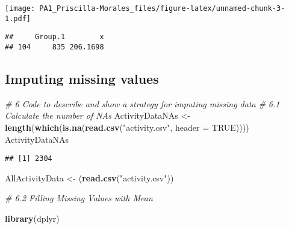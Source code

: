 \documentclass[
]{article}
\newenvironment{Shaded}{\begin{snugshade}}{\end{snugshade}}
\newcommand{\CommentTok}[1]{\textcolor[rgb]{0.56,0.35,0.01}{\textit{#1}}}
\newcommand{\DataTypeTok}[1]{\textcolor[rgb]{0.13,0.29,0.53}{#1}}
\newcommand{\KeywordTok}[1]{\textcolor[rgb]{0.13,0.29,0.53}{\textbf{#1}}}
\newcommand{\NormalTok}[1]{#1}
\newcommand{\OperatorTok}[1]{\textcolor[rgb]{0.81,0.36,0.00}{\textbf{#1}}}
\newcommand{\OtherTok}[1]{\textcolor[rgb]{0.56,0.35,0.01}{#1}}
\newcommand{\StringTok}[1]{\textcolor[rgb]{0.31,0.60,0.02}{#1}}
\begin{document}
\texttt{[image: PA1\_Priscilla-Morales\_files/figure-latex/unnamed-chunk-3-1.pdf]}

\begin{Shaded}
\end{Shaded}

\begin{verbatim}
##     Group.1        x
## 104     835 206.1698
\end{verbatim}

\hypertarget{imputing-missing-values}{%
\subsection{Imputing missing values}\label{imputing-missing-values}}

\begin{Shaded}
\begin{Highlighting}[]
\CommentTok{# 6 Code to describe and show a strategy for imputing missing data}
\CommentTok{# 6.1 Calculate the number of NAs}
\NormalTok{ActivityDataNAs <-}\StringTok{ }\KeywordTok{length}\NormalTok{(}\KeywordTok{which}\NormalTok{(}\KeywordTok{is.na}\NormalTok{(}\KeywordTok{read.csv}\NormalTok{(}\StringTok{"activity.csv"}\NormalTok{, }\DataTypeTok{header =} \OtherTok{TRUE}\NormalTok{))))}
\NormalTok{ActivityDataNAs}
\end{Highlighting}
\end{Shaded}

\begin{verbatim}
## [1] 2304
\end{verbatim}

\begin{Shaded}
\begin{Highlighting}[]
\NormalTok{AllActivityData <-}\StringTok{ }\NormalTok{(}\KeywordTok{read.csv}\NormalTok{(}\StringTok{"activity.csv"}\NormalTok{))}

\CommentTok{# 6.2 Filling Missing Values with Mean }

\KeywordTok{library}\NormalTok{(dplyr)}
\end{Highlighting}
\end{Shaded}
\end{document}

